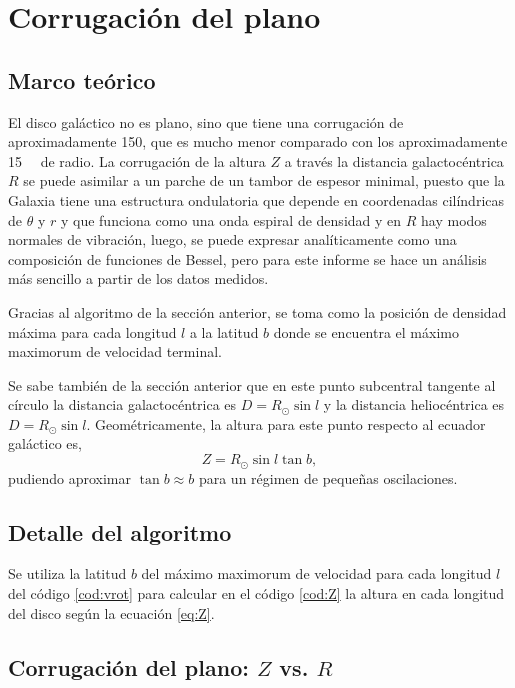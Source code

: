 \section{Corrugación del plano}

\subsection{Marco teórico}

El disco galáctico no es plano, sino que tiene una corrugación de aproximadamente \SI{150}{\parsec}, que es mucho menor comparado con los aproximadamente \SI{15}{\kilo\parsec} de radio. La corrugación de la altura $Z$ a través la distancia galactocéntrica $R$ se puede asimilar a un parche de un tambor de espesor minimal, puesto que la Galaxia tiene una estructura ondulatoria que depende en coordenadas cilíndricas de $\theta$ y $r$ y que funciona como una onda espiral de densidad y en $R$ hay modos normales de vibración, luego, se puede expresar analíticamente como una composición de funciones de Bessel, pero para este informe se hace un análisis más sencillo a partir de los datos medidos.

Gracias al algoritmo de la sección anterior, se toma como la posición de densidad máxima para cada longitud $l$ a la latitud $b$ donde se encuentra el máximo maximorum de velocidad terminal.

Se sabe también de la sección anterior que en este punto subcentral tangente al círculo la distancia galactocéntrica es $D=R_\odot\sin l$ y la distancia heliocéntrica es $D=R_\odot\sin l$. Geométricamente, la altura para este punto respecto al ecuador galáctico es,
\begin{equation}
Z=R_\odot\sin l\tan b
,\label{eq:Z}\end{equation}
pudiendo aproximar $\tan b\approx b$ para un régimen de pequeñas oscilaciones.

\subsection{Detalle del algoritmo}

Se utiliza la latitud $b$ del máximo maximorum de velocidad para cada longitud $l$ del código \ref{cod:vrot} para calcular en el código \ref{cod:Z} la altura en cada longitud del disco según la ecuación \ref{eq:Z}. 

\subsection{Corrugación del plano: $Z$ vs. $R$}

